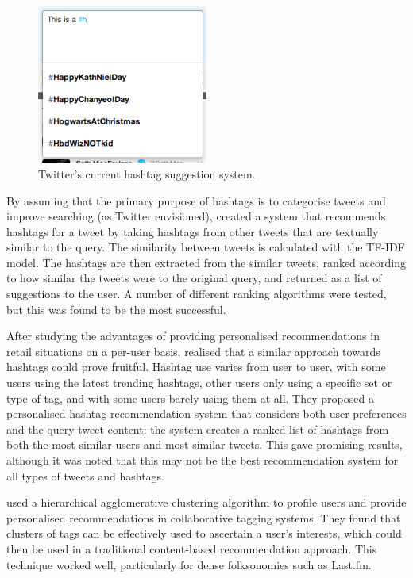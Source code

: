 \documentclass[11pt,a4paper]{report}
\begin{document}
\begin{figure}[htpb]
    \centering
    \includegraphics[width=0.5\textwidth]{twittersuggest.png}
    \caption{Twitter's current hashtag suggestion system.\label{fig:twittersuggest}}
\end{figure}

By assuming that the primary purpose of hashtags is to categorise tweets and improve searching (as Twitter envisioned), \textcite{Zangerle:2011} created a system that recommends hashtags for a tweet by taking hashtags from other tweets that are textually similar to the query. The similarity between tweets is calculated with the TF-IDF model. The hashtags are then extracted from the similar tweets, ranked according to how similar the tweets were to the original query, and returned as a list of suggestions to the user. A number of different ranking algorithms were tested, but this was found to be the most successful.

After studying the advantages of providing personalised recommendations in retail situations on a per-user basis, \textcite{Kywe:2012} realised that a similar approach towards hashtags could prove fruitful. Hashtag use varies from user to user, with some users using the latest trending hashtags, other users only using a specific set or type of tag, and with some users barely using them at all. They proposed a personalised hashtag recommendation system that considers both user preferences and the query tweet content: the system creates a ranked list of hashtags from both the most similar users and most similar tweets. This gave promising results, although it was noted that this may not be the best recommendation system for all types of tweets and hashtags.

\textcite{Shepitsen:2008} used a hierarchical agglomerative clustering algorithm to profile users and provide personalised recommendations in collaborative tagging systems. They found that clusters of tags can be effectively used to ascertain a user's interests, which could then be used in a traditional content-based recommendation approach. This technique worked well, particularly for dense folksonomies such as Last.fm.
\end{document}
